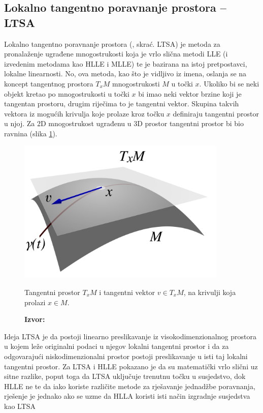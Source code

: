 \documentclass[times, utf8, diplomski]{fer}
\newcommand*{\captionsource}[2]{            %
    \RawFloats
    \caption{#1}
    \caption*{\textbf{Izvor:} #2}
}
\begin{document}
\subsection{Lokalno tangentno poravnanje prostora -- LTSA}

Lokalno tangentno poravnanje prostora (, skrać. LTSA) je metoda za pronalaženje ugrađene mnogostrukosti koja je vrlo slična metodi LLE (i izvedenim metodama kao HLLE i MLLE) te je bazirana na istoj pretpostavci, lokalne linearnosti. No, ova metoda, kao što je vidljivo iz imena, oslanja se na koncept tangentnog prostora $T_xM$ mnogostrukosti $M$ u točki $x$. Ukoliko bi se neki objekt kretao po mnogostrukosti u točki $x$ bi imao neki vektor brzine koji je tangentan prostoru, drugim riječima to je tangentni vektor. Skupina takvih vektora iz mogućih krivulja koje prolaze kroz točku $x$ definiraju tangentni prostor u njoj. Za 2D mnogostrukost ugrađenu u 3D prostor tangentni prostor bi bio ravnina (slika \ref{fig:tanget_space}).

\bigskip
\begin{figure}[htb]
    \centering
    \includegraphics[width=10cm]{resources/images/reduction/tanget_space.png}
    \captionsource{Tangentni prostor $T_{x}M$ i tangentni vektor $v \in T_{x}M$, na krivulji koja prolazi $ x \in M$.}{\cite{wikimedia2008tangent}}
    \label{fig:tanget_space}
\end{figure}
\bigskip

Ideja LTSA je da postoji linearno preslikavanje iz visokodimenzionalnog prostora u kojem leže originalni podaci u njegov lokalni tangentni prostor i da za odgovarajući niskodimenzionalni prostor postoji preslikavanje u isti taj lokalni tangentni prostor. Za LTSA i HLLE pokazano je da su matematički vrlo slični uz sitne razlike, poput toga da LTSA uključuje trenutnu točku u susjedstvo, dok HLLE ne te da iako koriste različite metode za rješavanje jednadžbe poravnanja, rješenje je jednako ako se uzme da HLLA koristi isti način izgradnje susjedstva kao LTSA \citep{7837655}
\end{document}
